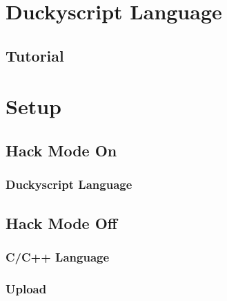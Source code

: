\documentclass[a4paper,12pt]{article}
\begin{document}
\section{Duckyscript Language}

\subsection{Tutorial}

\section{Setup}

\subsection{Hack Mode On}

\subsubsection{Duckyscript Language}

\subsection{Hack Mode Off}

\subsubsection{C/C++ Language}

\subsubsection{Upload}


\newpage
\end{document}
